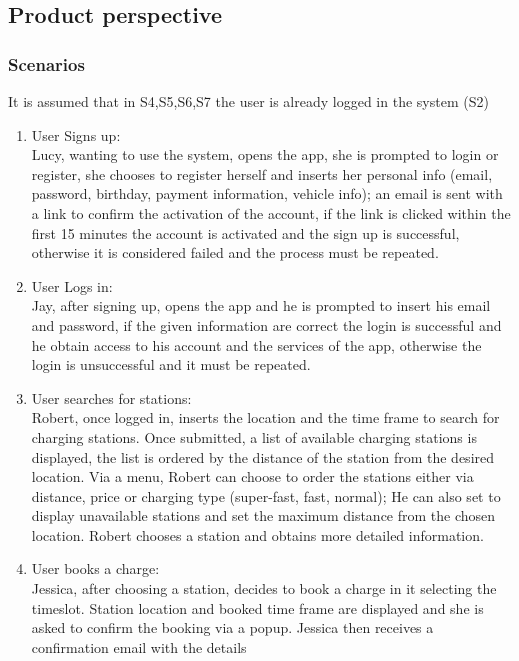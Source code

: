 \subsection{Product perspective}

\subsubsection{Scenarios}
It is assumed that in S4,S5,S6,S7 the user is already logged in the system (S2)
\begin{enumerate}[label=\textbf{S\arabic*}]
      \item User Signs up:\\
            Lucy, wanting to use the system, opens the app, she is prompted to login or register,
            she chooses to register herself and inserts her personal info (email, password, birthday, payment information, vehicle info);
            an email is sent with a link to confirm the activation of the account, if the link is clicked within
            the first 15 minutes the account is activated and the sign up is successful,
            otherwise it is considered failed and the process must be repeated.
      \item User Logs in:\\
            Jay, after signing up, opens the app and he is prompted to insert his email and password,
            if the given information are correct the login is successful and he obtain access to his account
            and the services of the app, otherwise the login is unsuccessful and it must be repeated.
      \item User searches for stations:\\
            Robert, once logged in, inserts the location and the time frame to search for charging stations.
            Once submitted, a list of available charging stations is displayed, the list is ordered by the distance of the station
            from the desired location. Via a menu, Robert can choose to order the stations either via distance, price or charging type (super-fast, fast, normal); He can also set to display unavailable stations and set the maximum distance from the chosen location.
            Robert chooses a station and obtains more detailed information.
      \item User books a charge:\\
            Jessica, after choosing a station, decides to book a charge in it selecting the timeslot. Station location and booked time frame are displayed and she is asked to confirm the booking via a popup. Jessica then receives a confirmation email with the details

\end{enumerate}
